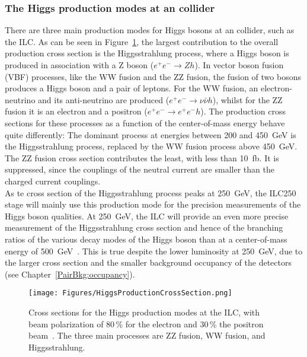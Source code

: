 \subsubsection{The Higgs production modes at an \positron\electron collider}
There are three main production modes for Higgs bosons at an \positron\electron collider, such as the ILC.
As can be seen in Figure~\ref{fig:HiggsProduction}, the largest contribution to the overall production cross section is the Higgsstrahlung process, where a Higgs boson is produced in association with a Z boson ($e^+e^-\rightarrow Zh$).
In vector boson fusion (VBF) processes, like the WW fusion and the ZZ fusion, the fusion of two bosons produces a Higgs boson and a pair of leptons.
For the WW fusion, an electron-neutrino and its anti-neutrino are produced ($e^+e^-\rightarrow \nu\bar{\nu} h$), whilst for the ZZ fusion it is an electron and a positron ($e^+e^-\rightarrow e^+e^-h$).
The production cross sections for these processes as a function of the center-of-mass energy behave quite differently:
The dominant process at energies between 200 and \SI{450}{\GeV} is the Higgsstrahlung process, replaced by the WW fusion process above \SI{450}{\GeV}.
The ZZ fusion cross section contributes the least, with less than \SI{10}{fb}.
It is suppressed, since the couplings of the neutral current are smaller than the charged current couplings.\\
As te cross section of the Higgsstrahlung process peaks at \SI{250}{\GeV}, the ILC250 stage will mainly use this production mode for the precision measurements of the Higgs boson qualities.
At \SI{250}{\GeV}, the ILC will provide an even more precise measurement of the Higgsstrahlung cross section and hence of the branching ratios of the various decay modes of the Higgs boson than at a center-of-mass energy of \SI{500}{\GeV}~\cite[p. 14]{PhysicsCase}.
This is true despite the lower luminosity at \SI{250}{\GeV}, due to the larger cross section and the smaller background occupancy of the detectors (see Chapter~\ref{PairBkg:occupancy}).
\begin{figure}
\centering
\texttt{[image: Figures/HiggsProductionCrossSection.png]}
\caption[Cross section for the Higgs production modes at ILC]{Cross sections for the Higgs production modes at the ILC, with beam polarization of 80\,\% for the electron and 30\,\% the positron beam~\cite[p. 13]{PhysicsCase}.
The three main processes are ZZ fusion, WW fusion, and Higgsstrahlung.}
\label{fig:HiggsProduction}
\end{figure}

